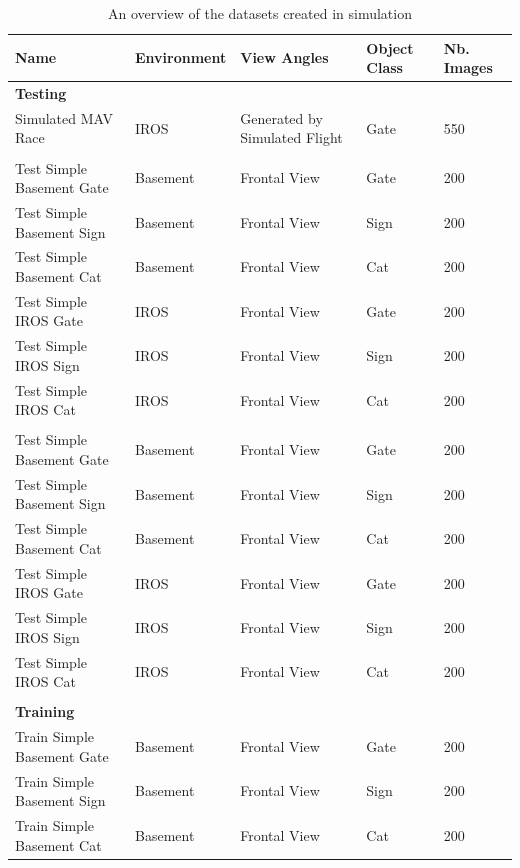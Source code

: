 \begin{table}[htbp]
	\caption{An overview of the datasets created in simulation}
	\begin{tabular}{|l|p{2cm}|p{4cm}|p{2cm}|p{1cm}|}
		\hline
		Name & Environment & View Angles & Object Class & \multicolumn{1}{l|}{Nb. Images} \\ \hline
		\textbf{Testing} &  &  &  & \multicolumn{1}{l|}{} \\ \hline
		Simulated MAV Race & IROS & Generated by Simulated Flight & Gate & 550 \\ \hline
		&  &  &  & \multicolumn{1}{l|}{} \\ \hline
		Test Simple Basement Gate & Basement & Frontal View & Gate & 200 \\ \hline
		Test Simple Basement Sign & Basement & Frontal View & Sign & 200 \\ \hline
		Test Simple Basement Cat & Basement & Frontal View & Cat & 200 \\ \hline
		Test Simple IROS Gate & IROS & Frontal View & Gate & 200 \\ \hline
		Test Simple IROS Sign & IROS & Frontal View & Sign & 200 \\ \hline
		Test Simple IROS Cat & IROS & Frontal View & Cat & 200 \\ \hline
		&  &  &  & \multicolumn{1}{l|}{} \\ \hline
		Test Simple Basement Gate & Basement & Frontal View & Gate & 200 \\ \hline
		Test Simple Basement Sign & Basement & Frontal View & Sign & 200 \\ \hline
		Test Simple Basement Cat & Basement & Frontal View & Cat & 200 \\ \hline
		Test Simple IROS Gate & IROS & Frontal View & Gate & 200 \\ \hline
		Test Simple IROS Sign & IROS & Frontal View & Sign & 200 \\ \hline
		Test Simple IROS Cat & IROS & Frontal View & Cat & 200 \\ \hline
		&  &  &  & \multicolumn{1}{l|}{} \\ \hline
		\textbf{Training} &  &  &  & \multicolumn{1}{l|}{} \\ \hline
		Train Simple Basement Gate & Basement & Frontal View & Gate & 200 \\ \hline
		Train Simple Basement Sign & Basement & Frontal View & Sign & 200 \\ \hline
		Train Simple Basement Cat & Basement & Frontal View & Cat & 200 \\ \hline

\end{tabular}
\end{table}
